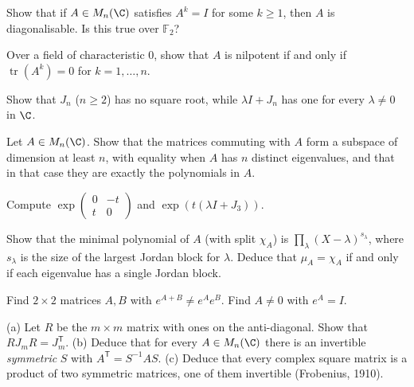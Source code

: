 \begin{exercise}[$\star\star$]\label{ex:finiteorder}
Show that if $A\in M_n(\C)$ satisfies $A^k=I$ for some $k\ge1$, then $A$ is diagonalisable. Is this true over
$\mathbb F_2$?
\end{exercise}

\begin{exercise}[$\star\star$]\label{ex:nilptrace}
Over a field of characteristic $0$, show that $A$ is nilpotent if and only if $\operatorname{tr}(A^k)=0$ for $k=1,\dots,n$.
\end{exercise}

\begin{exercise}[$\star\star$]\label{ex:sqrt}
Show that $J_n$ ($n\ge2$) has no square root, while $\lambda I+J_n$ has one for every $\lambda\ne0$ in $\C$.
\end{exercise}

\begin{exercise}[$\star\star$]\label{ex:commutant}
Let $A\in M_n(\C)$. Show that the matrices commuting with $A$ form a subspace of dimension at least $n$, with equality
when $A$ has $n$ distinct eigenvalues, and that in that case they are exactly the polynomials in $A$.
\end{exercise}

\begin{exercise}[$\star$]\label{ex:rotation}
Compute $\exp\begin{pmatrix}0&-t\\t&0\end{pmatrix}$ and $\exp(t(\lambda I+J_3))$.
\end{exercise}

\begin{exercise}[$\star\star$]\label{ex:minpolyjordan}
Show that the minimal polynomial of $A$ (with split $\chi_A$) is $\prod_\lambda(X-\lambda)^{s_\lambda}$, where $s_\lambda$ is the size of
the largest Jordan block for $\lambda$. Deduce that $\mu_A=\chi_A$ if and only if each eigenvalue has a single Jordan block.
\end{exercise}

\begin{exercise}[$\star\star$]\label{ex:expsum}
Find $2\times2$ matrices $A,B$ with $e^{A+B}\ne e^Ae^B$. Find $A\ne0$ with $e^A=I$.
\end{exercise}

\begin{exercise}[$\star\star\star$]\label{ex:symprod}
(a) Let $R$ be the $m\times m$ matrix with ones on the anti-diagonal. Show that $RJ_mR=J_m^{\mathsf T}$. (b) Deduce that for
every $A\in M_n(\C)$ there is an invertible \emph{symmetric} $S$ with $A^{\mathsf T}=S^{-1}AS$. (c) Deduce that every complex
square matrix is a product of two symmetric matrices, one of them invertible (Frobenius, 1910).
\end{exercise}


